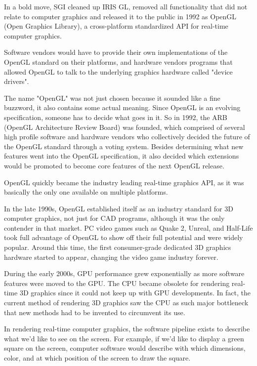 In a bold move, SGI cleaned up IRIS GL, removed all functionality that
did not relate to computer graphics and released it to the public in 1992 as
OpenGL (Open Graphics Library), a cross-platform standardized API for real-time
computer graphics.

Software vendors would have to provide their own implementations of the
OpenGL standard on their platforms, and hardware vendors programs that
allowed OpenGL to talk to the underlying graphics hardware called "device drivers".

The name "OpenGL" was not just chosen because it sounded like a fine buzzword,
it also contains some actual meaning. Since OpenGL is an evolving specification,
someone has to decide what goes in it. So in 1992, the ARB (OpenGL Architecture
Review Board) was founded, which comprised of several high profile software and
hardware vendors who collectively decided the future of the OpenGL standard through
a voting system. Besides determining what new features went into the OpenGL
specification, it also decided which extensions would be promoted to become
core features of the next OpenGL release.

OpenGL quickly became the industry leading real-time graphics API,
as it was basically the only one available on multiple platforms.

In the late 1990s, OpenGL established itself as an industry standard for
3D computer graphics, not just for CAD programs, although it was the only
contender in that market. PC video games such as Quake 2, Unreal, and Half-Life
took full advantage of OpenGL to show off their full potential and were widely
popular. Around this time, the first consumer-grade dedicated 3D graphics
hardware started to appear, changing the video game industry forever.

During the early 2000s, GPU performance grew exponentially as more software
features were moved to the GPU. The CPU became obsolete for rendering real-time
3D graphics since it could not keep up with GPU developments. In fact, the current
method of rendering 3D graphics saw the CPU as such major bottleneck that new
methods had to be invented to circumvent its use.

In rendering real-time computer graphics, the software pipeline exists to
describe what we'd like to see on the screen.
For example, if we'd like to display a green square on the screen,
computer software would describe with which dimensions, color, and at which
position of the screen to draw the square.

